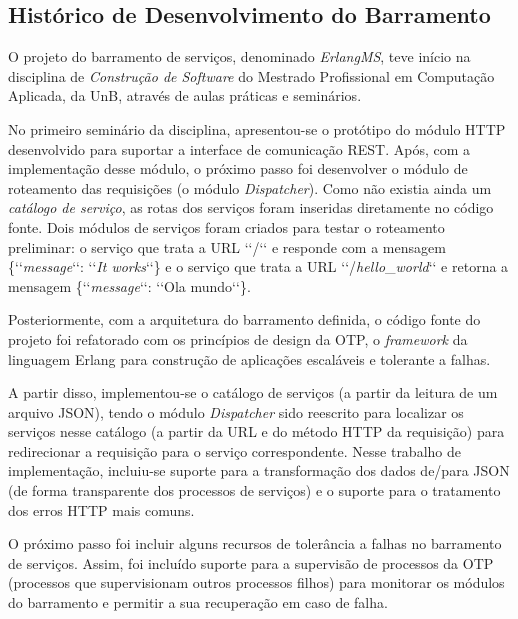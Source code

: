\subsection{Histórico de Desenvolvimento do Barramento}\label{historico_barramento}

O projeto do barramento de serviços, denominado \emph{ErlangMS}, 
teve início na disciplina de \textit{Construção de Software} do Mestrado
Profissional em Computação Aplicada, da \acrlong{UnB}, através de 
aulas práticas e seminários. 

No primeiro seminário da disciplina, apresentou-se o 
protótipo do módulo HTTP desenvolvido para 
suportar a interface de comunicação \acrshort{REST}. Após, 
com a implementação desse módulo, o próximo passo foi desenvolver o módulo de
roteamento das requisições (o módulo \textit{Dispatcher}). Como não 
existia ainda um \emph{catálogo de serviço}, as rotas dos serviços 
foram inseridas diretamente no código fonte. Dois módulos de serviços foram criados 
para testar o roteamento preliminar: o serviço que trata a \acrshort{URL} ‘‘/‘‘ e responde com a 
mensagem \{‘‘\textit{message}‘‘: ‘‘\textit{It works}‘‘\} e o serviço que trata 
a \acrshort{URL} ‘‘/\textit{hello}\_\textit{world}‘‘ e retorna a 
mensagem \{‘‘\textit{message}‘‘: ‘‘Ola mundo‘‘\}.

Posteriormente, com a arquitetura do barramento definida, o código fonte
do projeto foi refatorado com os princípios de design da \acrfull{OTP}, 
o \textit{framework} da linguagem Erlang para construção 
de aplicações escaláveis e tolerante a falhas.

A partir disso, implementou-se o catálogo de serviços (a partir 
da leitura de um arquivo \acrshort{JSON}), tendo
o módulo \textit{Dispatcher} sido reescrito para localizar
os serviços nesse catálogo (a partir da \acrshort{URL} e do método
\acrshort{HTTP} da requisição) para redirecionar a requisição
para o serviço correspondente. Nesse trabalho de implementação, incluiu-se 
suporte para a transformação dos dados de/para \acrshort{JSON} (de
forma transparente dos processos de serviços) e 
o suporte para o tratamento dos erros \acrshort{HTTP} mais comuns. 

O próximo passo foi incluir alguns recursos de tolerância a falhas 
no barramento de serviços. Assim, foi incluído suporte 
para a supervisão de processos da \acrshort{OTP} (processos que
supervisionam outros processos filhos) para monitorar os módulos
do barramento e permitir a sua recuperação em caso de falha.

